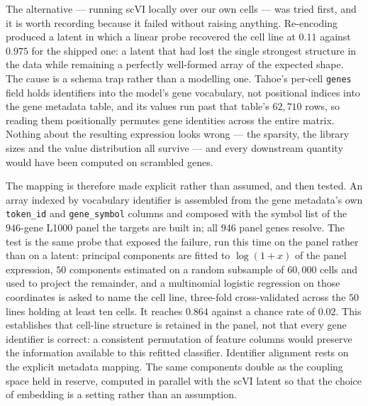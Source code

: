 The alternative --- running scVI locally over our own cells --- was tried first, and
it is worth recording because it failed without raising anything. Re-encoding
produced a latent in which a linear probe recovered the cell line at $0.11$
against $0.975$ for the shipped one: a latent that had lost the single strongest
structure in the data while remaining a perfectly well-formed array of the
expected shape. The cause is a schema trap rather than a modelling one. Tahoe's
per-cell \texttt{genes} field holds identifiers into the model's gene vocabulary,
not positional indices into the gene metadata table, and its values run past that
table's $62{,}710$ rows, so reading them positionally permutes gene identities
across the entire matrix. Nothing about the resulting expression looks wrong ---
the sparsity, the library sizes and the value distribution all survive --- and every
downstream quantity would have been computed on scrambled genes.

The mapping is therefore made explicit rather than assumed, and then tested. An
array indexed by vocabulary identifier is assembled from the gene metadata's own
\texttt{token\_id} and \texttt{gene\_symbol} columns and composed with the symbol
list of the $946$-gene L1000 panel the targets are built in; all $946$ panel genes
resolve. The test is the same probe that exposed the failure, run this time on the
panel rather than on a latent: principal components are fitted to $\log(1+x)$ of
the panel expression, $50$ components estimated on a random subsample of $60{,}000$
cells and used to project the remainder, and a multinomial logistic regression on
those coordinates is asked to name the cell line, three-fold cross-validated across
the $50$ lines holding at least ten cells. It reaches $0.864$ against a chance rate
of $0.02$. This establishes that cell-line structure is retained in the panel,
not that every gene identifier is correct: a consistent permutation of feature
columns would preserve the information available to this refitted classifier.
Identifier alignment rests on the explicit metadata mapping. The same
components double as the coupling space held in
reserve, computed in parallel with the scVI latent so that the choice of embedding
is a setting rather than an assumption.

